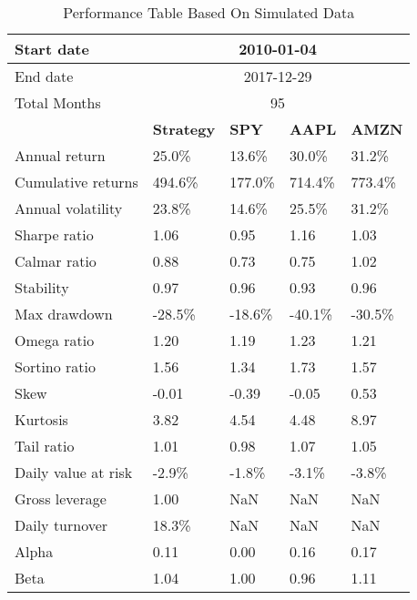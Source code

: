 \documentclass[12pt]{article}
\begin{document}
\begin{table}[H]
\centering
\begin{tabular}{@{}lllll@{}}
\toprule
Start date          & \multicolumn{4}{c}{2010-01-04}                                   \\ \midrule
End date            & \multicolumn{4}{c}{2017-12-29}                                   \\ \midrule
Total Months        & \multicolumn{4}{c}{95}                                           \\ \midrule
\textbf{}           & \textbf{Strategy} & \textbf{SPY} & \textbf{AAPL} & \textbf{AMZN} \\ \midrule
Annual return       & 25.0\%            & 13.6\%       & 30.0\%        & 31.2\%        \\
Cumulative returns  & 494.6\%           & 177.0\%      & 714.4\%       & 773.4\%       \\
Annual volatility   & 23.8\%            & 14.6\%       & 25.5\%        & 31.2\%        \\
Sharpe ratio        & 1.06              & 0.95         & 1.16          & 1.03          \\
Calmar ratio        & 0.88              & 0.73         & 0.75          & 1.02          \\
Stability           & 0.97              & 0.96         & 0.93          & 0.96          \\
Max drawdown        & -28.5\%           & -18.6\%      & -40.1\%       & -30.5\%       \\
Omega ratio         & 1.20              & 1.19         & 1.23          & 1.21          \\
Sortino ratio       & 1.56              & 1.34         & 1.73          & 1.57          \\
Skew                & -0.01             & -0.39        & -0.05         & 0.53          \\
Kurtosis            & 3.82              & 4.54         & 4.48          & 8.97          \\
Tail ratio          & 1.01              & 0.98         & 1.07          & 1.05          \\
Daily value at risk & -2.9\%            & -1.8\%       & -3.1\%        & -3.8\%        \\
Gross leverage      & 1.00              & NaN          & NaN           & NaN           \\
Daily turnover      & 18.3\%            & NaN          & NaN           & NaN           \\
Alpha               & 0.11              & 0.00         & 0.16          & 0.17          \\
Beta                & 1.04              & 1.00         & 0.96          & 1.11          \\ \bottomrule
\end{tabular}
\caption{Performance Table Based On Simulated Data}
\label{table:performance_table}
\end{table}
\end{document}
